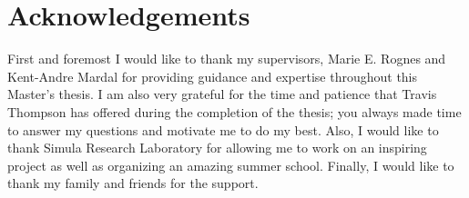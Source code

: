 \chapter{Acknowledgements}

First and foremost I would like to thank my supervisors, Marie E. Rognes and Kent-Andre Mardal for providing guidance and expertise throughout this Master's thesis. I am also very grateful for the time and patience that Travis Thompson has offered during the completion of the thesis; you always made time to answer my questions and motivate me to do my best. Also, I would like to thank Simula Research Laboratory for allowing me to work on an inspiring project as well as organizing an amazing summer school. Finally, I would like to thank my family and friends for the support.

